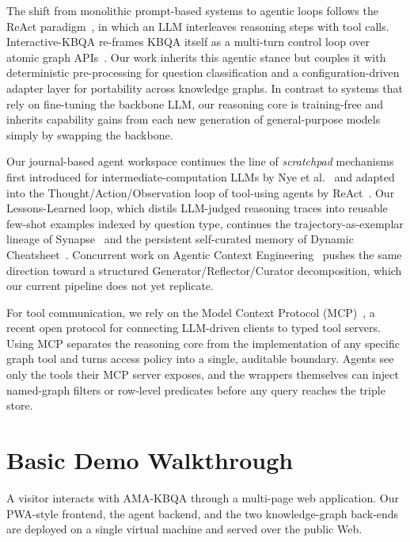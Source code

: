 \documentclass[sigconf,natbib=true]{ceurart}
\begin{document}
The shift from monolithic prompt-based systems to agentic loops
follows the ReAct paradigm~\cite{yao2023react}, in which an LLM
interleaves reasoning steps with tool calls. Interactive-KBQA
re-frames KBQA itself as a multi-turn control loop over atomic graph
APIs~\cite{xiong-etal-2024-interactive}. Our work inherits this
agentic stance but couples it with deterministic pre-processing for
question classification and a configuration-driven adapter layer for
portability across knowledge graphs. In contrast to systems that
rely on fine-tuning the backbone LLM, our reasoning core is
training-free and inherits capability gains from each new generation
of general-purpose models simply by swapping the backbone.

Our journal-based agent workspace continues the line of
\emph{scratchpad} mechanisms first introduced for
intermediate-computation LLMs by Nye et al.~\cite{nye2021scratchpad}
and adapted into the Thought/Action/Observation loop of tool-using
agents by ReAct~\cite{yao2023react}. Our Lessons-Learned loop, which
distils LLM-judged reasoning traces into reusable few-shot examples
indexed by question type, continues the trajectory-as-exemplar
lineage of Synapse~\cite{zheng2024synapse} and the persistent
self-curated memory of Dynamic Cheatsheet~\cite{suzgun2025dynamic}.
Concurrent work on Agentic Context Engineering~\cite{zhang2025ace}
pushes the same direction toward a structured
Generator/Reflector/Curator decomposition, which our current pipeline
does not yet replicate.

For tool communication, we rely on the Model Context Protocol
(MCP)~\cite{anthropic2024mcp}, a recent open protocol for connecting
LLM-driven clients to typed tool servers. Using MCP separates the
reasoning core from the implementation of any specific graph tool and
turns access policy into a single, auditable boundary. Agents see
only the tools their MCP server exposes, and the wrappers themselves
can inject named-graph filters or row-level predicates before any
query reaches the triple store.

\section{Basic Demo Walkthrough}

A visitor interacts with AMA-KBQA through a multi-page web
application. Our PWA-style frontend, the agent backend, and the two
knowledge-graph back-ends are deployed on a single virtual machine and
served over the public Web.
\end{document}

